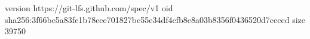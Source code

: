 version https://git-lfs.github.com/spec/v1
oid sha256:3f66bc5a83fe1b78ece701827bc55e34df4cfb8c8a03b8356f0436520d7ceccd
size 39750
